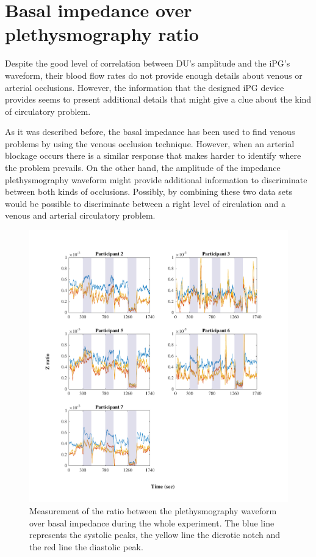 \section{Basal impedance over plethysmography ratio} %
\label{section discussion 2}

Despite the good level of correlation between DU's amplitude and the iPG's waveform, their blood flow rates do not provide enough details about venous or arterial occlusions. However, the information that the designed iPG device provides seems to present additional details that might give a clue about the kind of circulatory problem. 

As it was described before, the basal impedance has been used to find venous problems by using the venous occlusion technique. However, when an arterial blockage occurs there is a similar response that makes harder to identify where the problem prevails. On the other hand, the amplitude of the impedance plethysmography waveform might provide additional information to discriminate between both kinds of occlusions. Possibly, by combining these two data sets would be possible to discriminate between a right level of circulation and a venous and arterial circulatory problem. 

 \begin{figure}[!htpb]
 	\includegraphics[width=1\textwidth,keepaspectratio]{figure1}    
 	\caption[Ratio of the plethysmography waveform over basal impedance during the experiment]{Measurement of the ratio between the plethysmography waveform over basal impedance during the whole experiment. The blue line represents the systolic peaks, the yellow line the dicrotic notch and the red line the diastolic peak.}
 	\label{fig:ratio Z}
 \end{figure}

